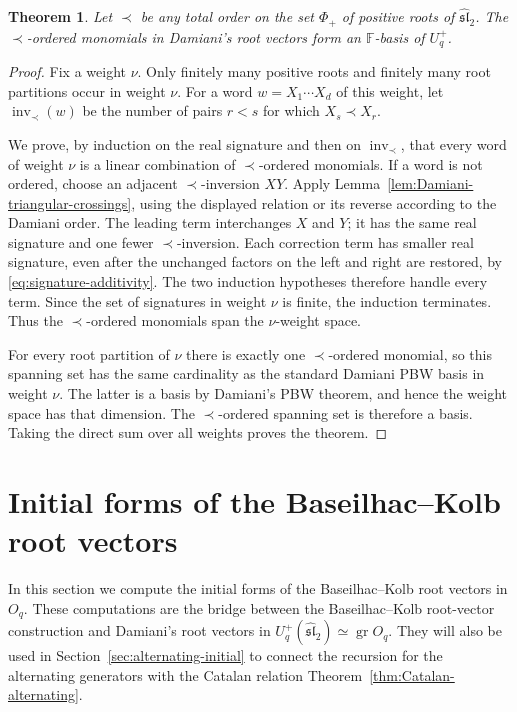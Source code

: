 \documentclass[11pt]{extarticle}
\newtheorem{theorem}{Theorem}[section]
\theoremstyle{definition}
\theoremstyle{remark}
\numberwithin{equation}{section}
\newcommand{\F}{\mathbb F}
\newcommand{\Oq}{O_q}
\newcommand{\Uplus}{U_q^+(\widehat{\mathfrak{sl}}_2)}
\newcommand{\gr}{\operatorname{gr}}
\begin{document}
\begin{theorem}
\label{thm:any-Damiani}
Let $\prec$ be any total order on the set $\Phi_+$ of positive roots of
$\widehat{\mathfrak{sl}}_2$.  The $\prec$-ordered monomials in Damiani's
root vectors form an $\F$-basis of $U_q^+$.
\end{theorem}

\begin{proof}
Fix a weight $\nu$.  Only finitely many positive roots and finitely many
root partitions occur in weight $\nu$.  For a word $w=X_1\cdots X_d$ of
this weight, let $\operatorname{inv}_\prec(w)$ be the number of pairs
$r<s$ for which $X_s\prec X_r$.

We prove, by induction on the real signature and then on
$\operatorname{inv}_\prec$, that every word of weight $\nu$ is a linear
combination of $\prec$-ordered monomials.  If a word is not ordered, choose
an adjacent $\prec$-inversion $XY$.  Apply
Lemma~\ref{lem:Damiani-triangular-crossings}, using the displayed relation
or its reverse according to the Damiani order.  The leading term interchanges
$X$ and $Y$; it has the same real signature and one fewer
$\prec$-inversion.  Each correction term has smaller real signature, even
after the unchanged factors on the left and right are restored, by
\eqref{eq:signature-additivity}.  The two induction hypotheses therefore
handle every term.  Since the set of signatures in weight $\nu$ is finite,
the induction terminates.  Thus the $\prec$-ordered monomials span the
$\nu$-weight space.

For every root partition of $\nu$ there is exactly one $\prec$-ordered
monomial, so this spanning set has the same cardinality as the standard
Damiani PBW basis in weight $\nu$.  The latter is a basis by Damiani's PBW
theorem, and hence the weight space has that dimension.  The
$\prec$-ordered spanning set is therefore a basis.  Taking the direct sum
over all weights proves the theorem.
\end{proof}


\section{Initial forms of the Baseilhac--Kolb root vectors}
\label{sec:root-initial}

In this section we compute the initial forms of the Baseilhac--Kolb root
vectors in \(\Oq\).  These computations are the bridge between the
Baseilhac--Kolb root-vector construction and Damiani's root vectors in
\(\Uplus\simeq\gr\Oq\).  They will also be used in
Section~\ref{sec:alternating-initial} to connect the recursion for the
alternating generators with the Catalan relation
Theorem~\ref{thm:Catalan-alternating}.
\end{document}
